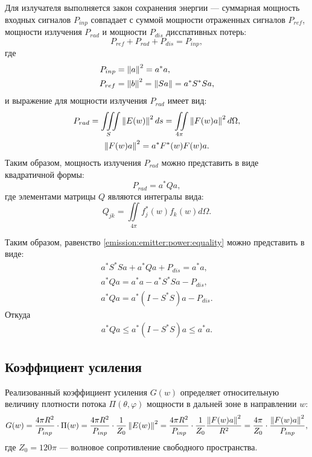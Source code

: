 Для излучателя выполняется закон сохранения энергии --- суммарная мощность входных сигналов $P_{inp}$ совпадает с суммой мощности отраженных сигналов $P_{ref}$,
мощности излучения $P_{rad}$ и мощности $P_{dis}$ дисспативных потерь:
\begin{equation}
    \label{emission:emitter:power:equality}
    P_{ref} + P_{rad} + P_{dis} = P_{inp} ,
\end{equation}
где
\begin{align}
    P_{inp} & = \left \| a \right \|^2 = a^* a , \label{emission:emitter:power:input}\\
    P_{ref} & = \left \| b \right \|^2 = \left \| S a \right \| = a^* S^* S a \notag,
\end{align}
и выражение для мощности излучения $P_{rad}$ имеет вид:
\begin{gather*}
    P_{rad}
    = \iiint \limits_S \left \| E(w) \right \|^2 ds
    = \iint \limits_{4 \pi} \left \| F(w) a \right \|^2 d \Omega , \\
    \left \| F(w) a \right \|^2
    = a^* F^*(w) F(w) a .
\end{gather*}
Таким образом, мощность излучения $P_{rad}$ можно представить в виде квадратичной формы:
\begin{equation}
    \label{emission:emitter:power:radiated}
    P_{rad}
    = a^* Q a ,
\end{equation}
где элементами матрицы $Q$ являются интегралы вида:
\[
    Q_{jk} = \iint \limits_{4 \pi} f_j^*(w) f_k(w) d \Omega .
\]

Таким образом, равенство \eqref{emission:emitter:power:equality} можно представить в виде:
\begin{gather*}
    a^* S^* S a + a^* Q a + P_{dis} = a^* a , \\
    a^* Q a = a^* a - a^* S^* S a - P_{dis}, \\
    a^* Q a = a^* ( I - S^* S ) a - P_{dis} .
\end{gather*}
Откуда
\begin{gather*}
    \label{emission:emitter:power:inequality}
    a^* Q a \le a^* ( I - S^* S ) a \le a^* a.
\end{gather*}

\subsection{Коэффициент усиления}

Реализованный коэффициент усиления $G(w)$ определяет относительную величину плотности потока $\Pi(\theta, \varphi)$ мощности в дальней зоне в
направлении $w$:
\[
    G(w)
    = \frac{4 \pi R^2}{P_{inp}} \cdot \Pi(w)
    = \frac{4 \pi R^2}{P_{inp}} \cdot \frac{1}{Z_0} \left \| E(w) \right \|^2
    = \frac{4 \pi R^2}{P_{inp}} \cdot \frac{1}{Z_0} \frac{\left \| F(w) a \right \|^2}{R^2}
    = \frac{4 \pi}{Z_0} \cdot \frac{\left \| F(w) a \right \|^2}{P_{inp}} ,
\]
где $Z_0 = 120 \pi$ --- волновое сопротивление свободного пространства.

